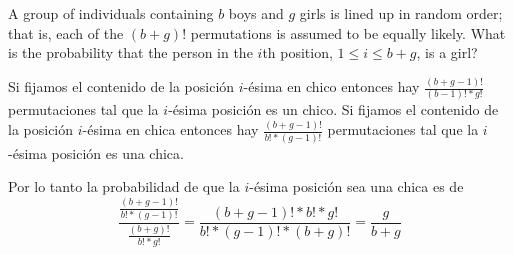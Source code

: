 \item A group of individuals containing $b$ boys and $g$ girls is lined up in random order; that is, each of the $(b + g)!$ permutations is assumed to be equally likely. What is the probability that the person in the $i$th position, $1 \le i \le b + g$, is a girl?

Si fijamos el contenido de la posición $i$-ésima en chico entonces hay $\frac{(b+g-1)!}{(b-1)!*g!}$ permutaciones tal que la $i$-ésima posición es un chico. Si fijamos el contenido de la posición $i$-ésima en chica entonces hay $\frac{(b+g-1)!}{b!*(g-1)!}$ permutaciones tal que la $i$-ésima posición es una chica.

Por lo tanto la probabilidad de que la $i$-ésima posición sea una chica es de
\[ \frac{\frac{(b+g-1)!}{b!*(g-1)!}}{\frac{(b+g)!}{b! * g!}} 
= 
\frac{(b+g-1)! * b! * g!}{b!*(g-1)! * (b+g)!}
=
\frac{g}{b+g}
\]